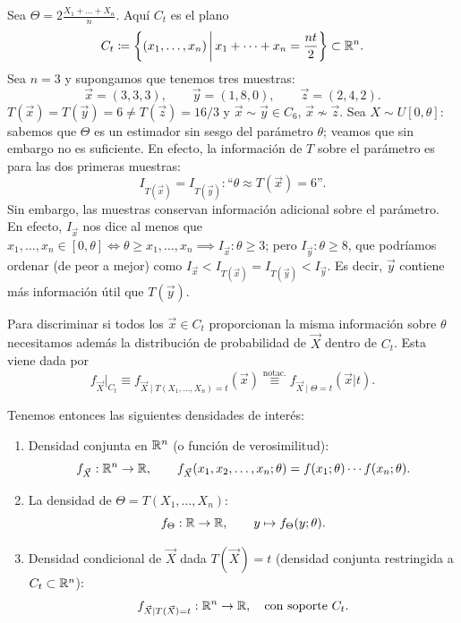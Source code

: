 \begin{ejemplo}
Sea $\Theta = 2\frac{X_1 + \dots + X_n}{n}$. Aquí $C_t$ es el plano
\[
  C_t \coloneqq \left\{(x_1, \dots, x_n) \,\middle|\, x_1 + \dots + x_n = \frac{nt}{2}\right\} \subset \mathbb{R}^n.
\]
Sea $n = 3$ y supongamos que tenemos tres muestras:
\[
  \vec{x} = (3, 3, 3), \qquad \vec{y} = (1, 8, 0), \qquad \vec{z} = (2, 4, 2).
\]
$T(\vec{x}) = T(\vec{y}) = 6 \neq T(\vec{z}) = 16/3$ y $\vec{x} \sim \vec{y} \in C_6$, $\vec{x} \not\sim \vec{z}$. Sea $X \sim U[0, \theta]$: sabemos que $\Theta$ es un estimador sin sesgo del parámetro $\theta$; veamos que sin embargo no es suficiente. En efecto, la información de $T$ sobre el parámetro es para las dos primeras muestras:
\[
  I_{T(\vec{x})} = I_{T(\vec{y})} : \text{``}\theta \approx T(\vec{x}) = 6\text{''}.
\]
Sin embargo, las muestras conservan información adicional sobre el parámetro. En efecto, $I_{\vec{x}}$ nos dice al menos que $x_1, \dots, x_n \in [0, \theta] \iff \theta \ge x_1, \dots, x_n \implies I_{\vec{x}} : \theta \ge 3$; pero $I_{\vec{y}} : \theta \ge 8$, que podríamos ordenar (de peor a mejor) como $I_{\vec{x}} < I_{T(\vec{x})} = I_{T(\vec{y})} < I_{\vec{y}}$. Es decir, $\vec{y}$ contiene más información útil que $T(\vec{y})$.

Para discriminar si todos los $\vec{x} \in C_t$ proporcionan la misma información sobre $\theta$ necesitamos además la distribución de probabilidad de $\vec{X}$ dentro de $C_t$. Esta viene dada por
\[
  f_{\vec{X}}|_{C_t} \equiv f_{\vec{X} \mid T(X_1, \dots, X_n) = t}(\vec{x}) \stackrel{\text{notac.}}{\equiv} f_{\vec{X} \mid \Theta = t}(\vec{x}|t).
\]
\end{ejemplo}

\begin{observacion}[2]
Tenemos entonces las siguientes densidades de interés:
\begin{enumerate}
  \item Densidad conjunta en $\mathbb{R}^n$ (o función de verosimilitud):
  \[
    f_{\vec{X}} : \mathbb{R}^n \to \mathbb{R}, \qquad f_{\vec{X}}(x_1, x_2, \dots, x_n; \theta) = f(x_1;\theta)\cdots f(x_n;\theta).
  \]
  \item La densidad de $\Theta = T(X_1, \dots, X_n)$:
  \[
    f_{\Theta} : \mathbb{R} \to \mathbb{R}, \qquad y \mapsto f_{\Theta}(y;\theta).
  \]
  \item Densidad condicional de $\vec{X}$ dada $T(\vec{X})=t$ (densidad conjunta restringida a $C_t \subset \mathbb{R}^n$):
  \[
    f_{\vec{X} \mid T(\vec{X}) = t} : \mathbb{R}^n \to \mathbb{R}, \quad \text{con soporte } C_t.
  \]
\end{enumerate}
\end{observacion}

